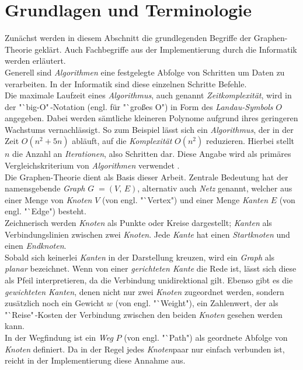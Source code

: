 \documentclass[12pt]{article}
\begin{document}
\section{Grundlagen und Terminologie}
\label{sec:basics}
Zunächst werden in diesem Abschnitt die grundlegenden Begriffe der Graphen-Theorie geklärt. Auch Fachbegriffe aus der Implementierung durch die Informatik werden erläutert.
\\
Generell sind \textit{Algorithmen} eine festgelegte Abfolge von Schritten um Daten zu verarbeiten. In der Informatik sind diese einzelnen Schritte Befehle.
\\
Die maximale Laufzeit eines \textit{Algorithmus}, auch genannt \textit{Zeitkomplexität}, wird in der "`big-O"\,-Notation (engl. für "`großes O") in Form des \textit{Landau-Symbols} $O$ angegeben. Dabei werden sämtliche kleineren Polynome aufgrund ihres geringeren Wachstums vernachlässigt. So zum Beispiel lässt sich ein \textit{Algorithmus}, der in der Zeit $O(n^2+5n)$ abläuft, auf die \textit{Komplexität} $O(n^2)$ reduzieren. Hierbei stellt $n$ die Anzahl an \textit{Iterationen}, also Schritten dar. Diese Angabe wird als primäres Vergleichskriterium von \textit{Algorithmen} verwendet \cite{big-o}.
\\
Die Graphen-Theorie dient als Basis dieser Arbeit. Zentrale Bedeutung hat der namensgebende \textit{Graph} $G\; = (V,\,E)$, alternativ auch \textit{Netz} genannt, welcher aus einer Menge von \textit{Knoten} $V$ (von engl. "`Vertex") und einer Menge \textit{Kanten} $E$ (von engl. "`Edge") besteht.
\\
Zeichnerisch werden \textit{Knoten} als Punkte oder Kreise dargestellt; \textit{Kanten} als Verbindungslinien zwischen zwei \textit{Knoten}. Jede \textit{Kante} hat einen \textit{Startknoten} und einen \textit{Endknoten}. 
\\
Sobald sich keinerlei \textit{Kanten} in der Darstellung kreuzen, wird ein \textit{Graph} als \textit{planar} bezeichnet. Wenn von einer \textit{gerichteten Kante} die Rede ist, lässt sich diese als Pfeil interpretieren, da die Verbindung unidirektional gilt. Ebenso gibt es die \textit{gewichteten Kanten}, denen nicht nur zwei \textit{Knoten} zugeordnet werden, sondern zusätzlich noch ein Gewicht $w$ (von engl. "`Weight"), ein Zahlenwert, der als "`Reise"\,-Kosten der Verbindung zwischen den beiden \textit{Knoten} gesehen werden kann.
\\
In der Wegfindung ist ein \textit{Weg} $P$ (von engl. "`Path") als geordnete Abfolge von \textit{Knoten} definiert. Da in der Regel jedes \textit{Knoten}paar nur einfach verbunden ist, reicht in der Implementierung diese Annahme aus.
\end{document}
